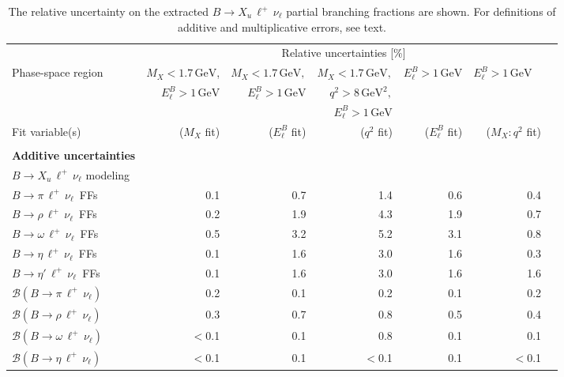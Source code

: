 \documentclass[twocolumn,aps,prd,superscriptaddress,nofootinbib,floatfix,preprintnumbers,a4]{revtex4-1}
\newcommand{\bulnu}{\ensuremath{B \to X_u \, \ell^+\, \nu_{\ell}}\xspace}
\newcommand{\bpilnu}{\ensuremath{B \to \pi \, \ell^+\,\nu_{\ell}}\xspace}
\newcommand{\brholnu}{\ensuremath{B \to \rho \, \ell^+\,\nu_{\ell}}\xspace}
\newcommand{\bomegalnu}{\ensuremath{B \to \omega \, \ell^+\,\nu_{\ell}}\xspace}
\newcommand{\betalnu}{\ensuremath{B \to \eta \, \ell^+\,\nu_{\ell}}\xspace}
\newcommand{\betaplnu}{\ensuremath{B \to \eta' \, \ell^+\,\nu_{\ell}}\xspace}
\renewcommand{\arraystretch}{1.25}
\begin{document}
\begin{table}[t!]
 \renewcommand{\arraystretch}{0.9} 
\caption{
	The relative uncertainty on the extracted \bulnu partial branching fractions are shown. For definitions of additive and multiplicative errors, see text. 
}
\label{tab:systematic_uncertainties}
\vspace{1ex}
\begin{tabular}{lrrrrrr}
\hline\hline
  &  \multicolumn{5}{c}{ Relative uncertainties [\%]} \\ 
 Phase-space region & $M_X < 1.7 \, \mathrm{GeV}$, & $M_X < 1.7 \, \mathrm{GeV},$ & $M_X < 1.7 \, \mathrm{GeV},$ & $E_\ell^B > 1 \, \mathrm{GeV}$ & $ E_\ell^B > 1 \, \mathrm{GeV}$ \ \\ 
   &  $E_\ell^B  > 1 \, \mathrm{GeV}$ &  $E_\ell^B > 1 \, \mathrm{GeV}$ & $q^2 > 8 \, \text{GeV}^2,$     \\ 
  &   &  &   $E_\ell^B > 1 \, \mathrm{GeV}$  \vspace{1ex}  \\ 
Fit variable(s)  &  ($M_X$ fit) &  ($E_\ell^B$ fit)  &  ($q^2$ fit) & ($E_\ell^B $ fit) &  ($M_X:q^2$ fit)   \vspace{1ex}  \\  
\hline  \vspace{1ex} \\
 {\bf Additive uncertainties} \\
 \quad \bulnu modeling & \\
 \qquad \bpilnu\ FFs & 0.1 & 0.7 & 1.4& 0.6 & 0.4 \\
 \qquad \brholnu\ FFs & 0.2 & 1.9 & 4.3& 1.9 & 0.7 \\
 \qquad \bomegalnu\ FFs & 0.5 & 3.2 & 5.2& 3.1 & 0.8 \\
 \qquad \betalnu\ FFs  & 0.1 & 1.6 & 3.0 & 1.6 & 0.3 \\
 \qquad \betaplnu\ FFs & 0.1 & 1.6 & 3.0 & 1.6 & 1.6 \\
 \qquad $\mathcal{B}(\bpilnu)$ & 0.2 & 0.1 & 0.2& 0.1 & 0.2 \\
 \qquad $\mathcal{B}(\brholnu)$ & 0.3 & 0.7 & 0.8& 0.5 & 0.4 \\
 \qquad $\mathcal{B}(\bomegalnu)$ & $<$0.1 & 0.1 & 0.8& 0.1 & 0.1 \\
 \qquad $\mathcal{B}(\betalnu)$ & $<$0.1 & 0.1 & $<$0.1& 0.1 & $<$0.1 \\

\end{tabular}
\end{table}
\end{document}
